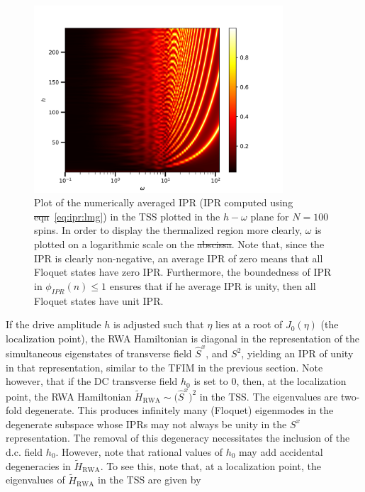\documentclass[%
reprint,
superscriptaddress,
amsmath,amssymb,
aps,
prb,
showkeys,
]{revtex4-2}
\providecommand{\DIFaddtex}[1]{{\protect\color{blue}\uwave{#1}}} %
\providecommand{\DIFdeltex}[1]{{\protect\color{red}\sout{#1}}}                      %
\providecommand{\DIFaddFL}[1]{\DIFadd{#1}} %
\providecommand{\DIFdelFL}[1]{\DIFdel{#1}} %
\providecommand{\DIFaddbeginFL}{} %
\providecommand{\DIFaddendFL}{} %
\providecommand{\DIFdelbeginFL}{} %
\providecommand{\DIFdelendFL}{} %
\providecommand{\DIFadd}[1]{\texorpdfstring{\DIFaddtex{#1}}{#1}} %
\providecommand{\DIFdel}[1]{\texorpdfstring{\DIFdeltex{#1}}{}} %
\newcommand{\DIFscaledelfig}{0.5}
\newlength{\DIFdelgraphicswidth} %
\newlength{\DIFdelgraphicsheight} %
\newcommand{\DIFaddincludegraphics}[2][]{{\color{blue}\fbox{\DIFOincludegraphics[#1]{#2}}}} %
\newcommand{\DIFdelincludegraphics}[2][]{%
\sbox{\DIFdelgraphicsbox}{\DIFOincludegraphics[#1]{#2}}%
\settoboxwidth{\DIFdelgraphicswidth}{\DIFdelgraphicsbox} %
\settoboxtotalheight{\DIFdelgraphicsheight}{\DIFdelgraphicsbox} %
\scalebox{\DIFscaledelfig}{%
\parbox[b]{\DIFdelgraphicswidth}{\usebox{\DIFdelgraphicsbox}\\[-\baselineskip] \rule{\DIFdelgraphicswidth}{0em}}\llap{\resizebox{\DIFdelgraphicswidth}{\DIFdelgraphicsheight}{%
\setlength{\unitlength}{\DIFdelgraphicswidth}%
\begin{picture}(1,1)%
\thicklines\linethickness{2pt} %
{\color[rgb]{1,0,0}\put(0,0){\framebox(1,1){}}}%
{\color[rgb]{1,0,0}\put(0,0){\line( 1,1){1}}}%
{\color[rgb]{1,0,0}\put(0,1){\line(1,-1){1}}}%
\end{picture}%
}\hspace*{3pt}}} %
} %
\DeclareRobustCommand{\DIFaddbeginFL}{\DIFOaddbeginFL \let\includegraphics\DIFaddincludegraphics} %
\DeclareRobustCommand{\DIFaddendFL}{\DIFOaddendFL \let\includegraphics\DIFOincludegraphics} %
\DeclareRobustCommand{\DIFdelbeginFL}{\DIFOdelbeginFL \let\includegraphics\DIFdelincludegraphics} %
\DeclareRobustCommand{\DIFdelendFL}{\DIFOaddendFL \let\includegraphics\DIFOincludegraphics} %
\begin{document}
\begin{figure}[t!]
	\centering
	\DIFdelbeginFL %
\DIFdelendFL \DIFaddbeginFL \includegraphics[width=9.3cm]{figure_4.jpeg}
	\DIFaddendFL \caption{Plot of the numerically averaged IPR (IPR computed using \DIFdelbeginFL \DIFdelFL{eqn}\DIFdelendFL \DIFaddbeginFL \DIFaddFL{eq.}\DIFaddendFL ~\ref{eq:ipr:lmg}) in the TSS plotted in the $h-\omega$ plane for $N=100$ spins. In order to display the thermalized region more clearly, $\omega$ is plotted on a logarithmic scale on the \DIFdelbeginFL \DIFdelFL{abscissa}\DIFdelendFL \DIFaddbeginFL \DIFaddFL{x-coordinate}\DIFaddendFL . Note that, since the IPR is clearly non-negative, an average IPR of zero means that all Floquet states have zero IPR. Furthermore, the boundedness of IPR in $\phi_{IPR}(n) \leq 1$ ensures that if he average IPR is unity, then all Floquet states have unit IPR.}
	\label{fig:lmg_phasediag}
\end{figure}
If the drive amplitude $h$ is adjusted such that $\eta$ lies at a root of $J_0(\eta)$ (the localization point), the RWA Hamiltonian is diagonal in the representation of the simultaneous eigenstates of transverse field $\hat{S}^x$, and $S^2$, yielding an IPR of unity in that representation, similar to the TFIM in the previous section. Note however, that if the DC transverse field $h_0$ is set to $0$, then, at the localization point, the RWA Hamiltonian $\tilde{H}_{\mathrm{RWA}}\sim
\big(\hat{S}^x\big)^2$ in the TSS. The eigenvalues are two-fold degenerate. This produces infinitely many (Floquet) eigenmodes in the degenerate subspace whose IPRs may not always be unity in the $S^x$ representation. The removal of this degeneracy necessitates the inclusion of the d.c. field $h_0$. However, note that rational values of $h_0$
may add accidental degeneracies in $\tilde{H}_{\mathrm{RWA}}$. To see this, note that, at a localization point, the eigenvalues of $\tilde{H}_{\mathrm{RWA}}$ in the TSS are given by
\end{document}
